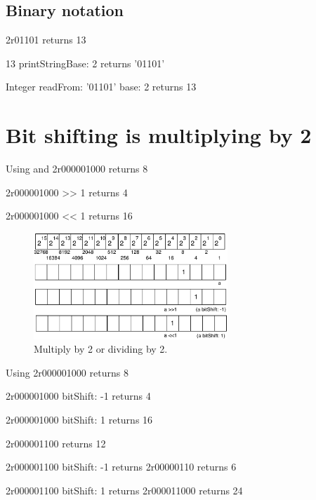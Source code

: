 \documentclass[a4paper,10pt,twoside]{book}
\begin{document}
\subsection*{Binary notation}
\begin{code}{}
2r01101
	returns 13

13 printStringBase: 2
	returns '01101'
	
Integer readFrom: '01101' base: 2 	
	returns 13
\end{code}



\section{Bit shifting is multiplying by 2}

\begin{code}{Using \ct{>>} and \ct{<<}}
2r000001000 
	returns 8

2r000001000 >> 1
	returns 4
	
2r000001000 << 1
	returns 16
\end{code}

\begin{figure}[h]
\begin{center}
\includegraphics[width=0.65\textwidth]{16bits-numberMultiplication}
\caption{Multiply by 2 or dividing by 2.}
\end{center}
\end{figure}

\begin{code}{Using }
2r000001000 
	returns 8

2r000001000 bitShift: -1
	returns 4
	
2r000001000 bitShift: 1
	returns 16
\end{code}

\begin{code}{}
2r000001100 
	returns 12

2r000001100 bitShift: -1
	returns 2r00000110
	returns 6 
	
2r000001100 bitShift: 1
	returns 2r000011000
	returns 24
\end{code}
\end{document}
